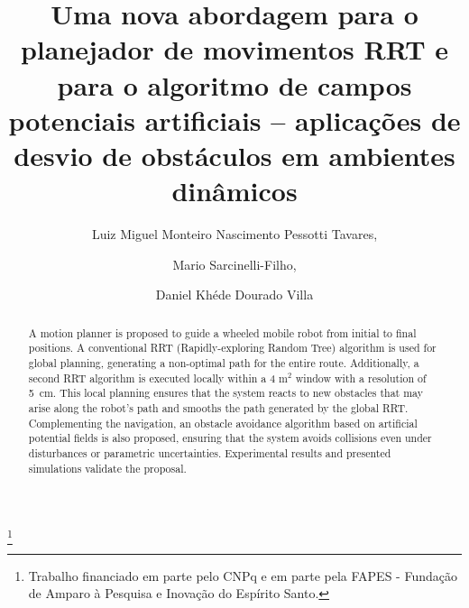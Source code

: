 \documentclass[a4paper]{IEEEconf}
\begin{document}
\title{Uma nova abordagem para o planejador de movimentos RRT e para o algoritmo de campos potenciais artificiais -- aplicações de desvio de obstáculos em ambientes dinâmicos}

\thanks[footnoteinfo]{Trabalho financiado em parte pelo CNPq e em parte pela FAPES - Fundação de Amparo à Pesquisa e Inovação do Espírito Santo.}

\author{Luiz Miguel Monteiro Nascimento Pessotti Tavares,}
\author{Mario Sarcinelli-Filho,}
\author[Fourth]{Daniel Khéde Dourado Villa}

\address[Fourth]{Departamento de Engenharia Elétrica,
	Universidade Federal do Espírito Santo, ES, Brasil, (e-mail: daniel.villa@ufes.br)}

\renewcommand{\abstractname}{{\bf Abstract:~}}
\begin{abstract}
	A motion planner is proposed to guide a wheeled mobile robot from initial to final positions. A conventional RRT (Rapidly-exploring Random Tree) algorithm is used for global planning, generating a non-optimal path for the entire route. Additionally, a second RRT algorithm is executed locally within a
	4 m$^2$ window with a resolution of \SI{5}{cm}. This local planning ensures that the system reacts to new obstacles that may arise along the robot's path and smooths the path generated by the global RRT. Complementing the navigation, an obstacle avoidance algorithm based on artificial potential fields is also proposed, ensuring that the system avoids collisions even under disturbances or parametric uncertainties. Experimental results and presented simulations validate the proposal.
\end{abstract}
\end{document}

